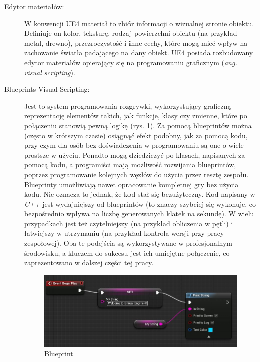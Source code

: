 \documentclass[multip]{SGGW-thesis}
\begin{document}
\begin{description}
\item[Edytor materiałów:]W konwencji UE4 materiał to zbiór informacji o wizualnej stronie obiektu. Definiuje on kolor, teksturę, rodzaj powierzchni obiektu (na przykład metal, drewno), przezroczystość i inne cechy, które mogą mieć wpływ na zachowanie światła padającego na dany obiekt. UE4 posiada rozbudowany edytor materiałów opierający się na programowaniu graficznym ({\em ang. visual scripting}).
\item[Blueprints Visual Scripting:]Jest to system programowania rozgrywki, wykorzystujący graficzną reprezentację elementów takich, jak funkcje, klasy czy zmienne, które po połączeniu stanowią pewną logikę (rys. \ref{fig-bp-example})\cite{docs-blueprints}. Za pomocą blueprintów można (często w krótszym czasie) osiągnąć efekt podobny, jak za pomocą kodu, przy czym dla osób bez doświadczenia w programowaniu są one o wiele prostsze w użyciu. Ponadto mogą dziedziczyć po klasach, napisanych za pomocą kodu, a programiści mają możliwość rozwijania blueprintów, poprzez programowanie kolejnych węzłów do użycia przez resztę zespołu. Blueprinty umożliwiają nawet opracowanie kompletnej gry bez użycia kodu. Nie oznacza to jednak, że kod stał się bezużyteczny. Kod napisany w {\em C++} jest wydajniejszy od blueprintów (to znaczy szybciej się wykonuje, co bezpośrednio wpływa na liczbę generowanych klatek na sekundę). W wielu przypadkach jest też czytelniejszy (na przykład obliczenia w pętli) i łatwiejszy w utrzymaniu (na przykład kontrola wersji przy pracy zespołowej).
\newline Oba te podejścia są wykorzystywane w profesjonalnym środowisku, a kluczem do sukcesu jest ich umiejętne połączenie, co zaprezentowano w dalszej części tej pracy.
\begin{figure}
	\centering
		\includegraphics[width=1\textwidth]{figures/bp_example.jpg}
	\caption{Blueprint}
	\label{fig-bp-example}
\end{figure}

\end{description}
\end{document}
